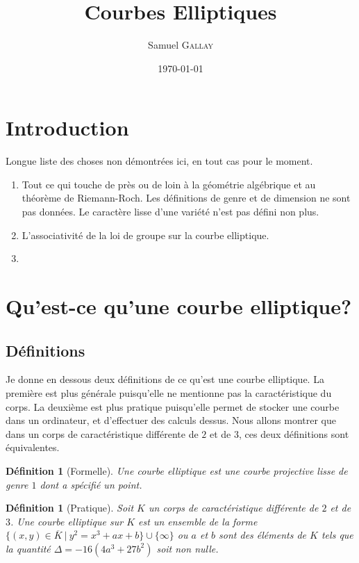 \documentclass{article}
\title{Courbes Elliptiques}
\author{Samuel \textsc{Gallay}}
\date{\today}
\theoremstyle{plain}%
\newtheorem{deff}[thm]{Définition}
\theoremstyle{definition}%
\newcommand{\ol}{\overline}
\begin{document}
\maketitle

\tableofcontents

\newpage

\section{Introduction}

Longue liste des choses non démontrées ici, en tout cas pour le moment.
\begin{enumerate}
  \item Tout ce qui touche de près ou de loin à la géométrie algébrique et au théorème de Riemann-Roch. Les définitions de genre et de dimension ne sont pas données. Le caractère lisse d'une variété n'est pas défini non plus.
  \item L'associativité de la loi de groupe sur la courbe elliptique.
  \item 
\end{enumerate}

\section{Qu'est-ce qu'une courbe elliptique?}

\subsection{Définitions}

Je donne en dessous deux définitions de ce qu'est une courbe elliptique. La première est plus générale puisqu'elle ne mentionne pas la  caractéristique du corps. La deuxième est plus pratique puisqu'elle permet de stocker une courbe dans un ordinateur, et d'effectuer des calculs dessus. Nous allons montrer que dans un corps de caractéristique différente de $2$ et de $3$, ces deux définitions sont équivalentes.

\begin{deff}[Formelle]
  Une courbe elliptique est une courbe projective lisse de genre $1$ dont a spécifié un point.
\end{deff}

\begin{deff}[Pratique]
  Soit $K$ un corps de caractéristique différente de $2$ et de $3$. Une courbe elliptique sur $K$ est un ensemble de la forme $\{(x, y)\in\ol K\ |\ y^2 = x^3 + ax +b\}\cup\{\infty\}$ ou $a$ et $b$ sont des éléments de $K$ tels que la quantité $\Delta =-16(4a^3+ 27b^2)$ soit non nulle.
\end{deff}
\end{document}
